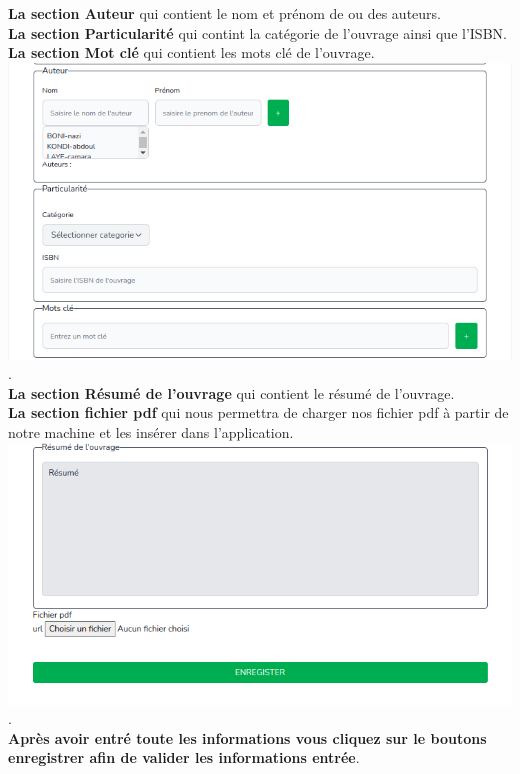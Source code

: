 \documentclass[12pt,a4paper]{article}
\begin{document}
\textbf{La section Auteur} qui contient le nom et prénom de ou des auteurs.\\
\textbf{La section Particularité} qui contint la catégorie de l'ouvrage ainsi que l'ISBN.\\
\textbf{La section Mot clé} qui contient les mots clé de l'ouvrage. \\

\includegraphics[scale=0.5]{images/APMelectro.png}.\\

\textbf{La section Résumé de l'ouvrage} qui contient le résumé de l'ouvrage.\\
\textbf{La section fichier pdf} qui nous permettra de charger nos fichier pdf à partir de notre machine et les insérer dans l'application.\\

\includegraphics[scale=0.5]{images/ResumeFichier.png}.\\

\textbf{Après avoir entré toute les informations vous cliquez sur le boutons enregistrer afin de valider les informations entrée}.\\
\end{document}
